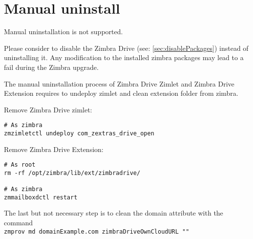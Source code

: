\section{Manual uninstall}

\begin{warning}
    Manual uninstallation is not supported.

    Please consider to disable the Zimbra Drive (see: \ref{sec:disablePackages}) instead of uninstalling it.
    Any modification to the installed zimbra packages may lead to a fail during the Zimbra upgrade.
\end{warning}

The manual uninstallation process of Zimbra Drive Zimlet and Zimbra Drive Extension requires to undeploy zimlet and clean extension folder from zimbra.

Remove Zimbra Drive zimlet:
\begin{verbatim}
# As zimbra
zmzimletctl undeploy com_zextras_drive_open
\end{verbatim}
Remove Zimbra Drive Extension:
\begin{verbatim}
# As root
rm -rf /opt/zimbra/lib/ext/zimbradrive/

# As zimbra
zmmailboxdctl restart
\end{verbatim}
The last but not necessary step is to clean the domain attribute with the command\\
\texttt{zmprov md domainExample.com zimbraDriveOwnCloudURL ""}
